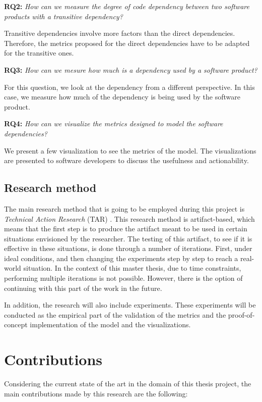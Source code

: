 \blankl
\textbf{RQ2:} \textit{How can we measure the degree of code dependency between two software products with a transitive dependency?} 

\blankls
Transitive dependencies involve more factors than the direct dependencies. Therefore, the metrics proposed for the direct dependencies have to be adapted for the transitive ones.

\blankl
\textbf{RQ3:} \textit{How can we mesure how much is a dependency used by a software product?}

\blankls
For this question, we look at the dependency from a different perspective. In this case, we measure how much of the dependency is being used by the software product.

\blankl
\textbf{RQ4:} \textit{How can we visualize the metrics designed to model the software dependencies?}

\blankls
We present a few visualization to see the metrics of the model. The visualizations are presented to software developers to discuss the usefulness and actionability.

\subsection{Research method}
The main research method that is going to be employed during this project is \textit{Technical Action Research} (TAR) \cite{wieringa2012technical}.
This research method is artifact-based, which means that the first step is to produce the artifact meant to be used in certain situations envisioned by the researcher. The testing of this artifact, to see if it is effective in these situations, is done through a number of iterations. First, under ideal conditions, and then changing the experiments step by step to reach a real-world situation. In the context of this master thesis, due to time constraints, performing multiple iterations is not possible. However, there is the option of continuing with this part of the work in the future.

\blankl
In addition, the research will also include experiments. These experiments will be conducted as the empirical part of the validation of the metrics and the proof-of-concept implementation of the model and the visualizations.

\section{Contributions}
Considering the current state of the art in the domain of this thesis project, the main contributions made by this research are the following:

